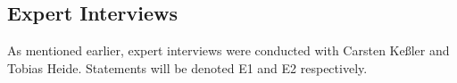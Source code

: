 


\subsection{Expert Interviews}
\label{sub:ev_expert_interviews}
As mentioned earlier, expert interviews were conducted with Carsten Ke{\ss}ler and Tobias Heide. Statements will be denoted E1 and E2 respectively.


